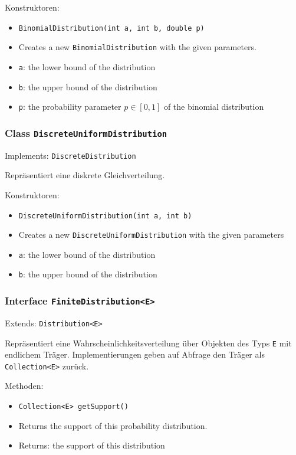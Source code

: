 \documentclass[parskip=full,11pt]{scrartcl}
\begin{document}
Konstruktoren:
\begin{itemize}\itemsep -10pt
\item \texttt{BinomialDistribution(int a, int b, double p)}
\item[] Creates a new \texttt{BinomialDistribution} with the given parameters.
\item[] \texttt{a}: the lower bound of the distribution
\item[] \texttt{b}: the upper bound of the distribution
\item[] \texttt{p}: the probability parameter \(p \in [0,1]\) of the binomial distribution
\end{itemize}

\subsubsection{Class \texttt{DiscreteUniformDistribution}}
Implements: \texttt{DiscreteDistribution}

Repräsentiert eine diskrete Gleichverteilung.

Konstruktoren:
\begin{itemize}\itemsep -10pt
\item \texttt{DiscreteUniformDistribution(int a, int b)}
\item[] Creates a new \texttt{DiscreteUniformDistribution} with the given parameters
\item[] \texttt{a}: the lower bound of the distribution
\item[] \texttt{b}: the upper bound of the distribution
\end{itemize}

\subsubsection{Interface \texttt{FiniteDistribution<E>}}
Extends: \texttt{Distribution<E>}

Repräsentiert eine Wahrscheinlichkeitsverteilung über Objekten des Typs \texttt{E} mit endlichem Träger. Implementierungen geben auf Abfrage den Träger als \texttt{Collection<E>} zurück.

Methoden:
\begin{itemize}\itemsep -10pt
\item \texttt{Collection<E> getSupport()}
\item[] Returns the support of this probability distribution.
\item[] Returns: the support of this distribution
\end{itemize}
\end{document}
